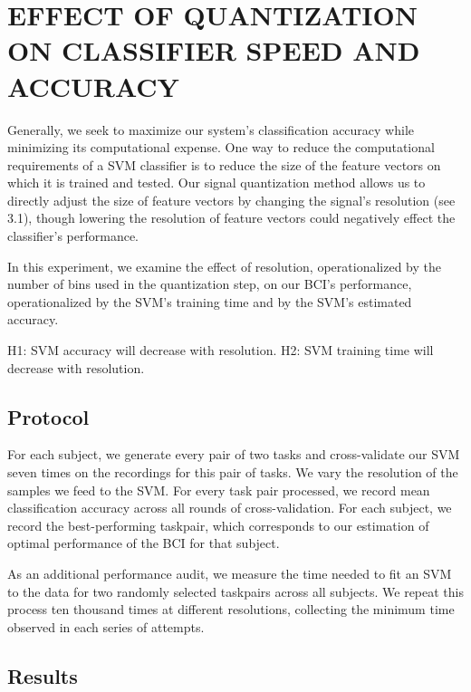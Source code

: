 \section{\uppercase{Effect of quantization on classifier speed and accuracy}}
\label{sec:results}

Generally, we seek to maximize our system's classification accuracy while minimizing its computational expense. One way to reduce the computational requirements of a SVM classifier is to reduce the size of the feature vectors on which it is trained and tested. Our signal quantization method allows us to directly adjust the size of feature vectors by changing the signal's resolution (see 3.1), though lowering the resolution of feature vectors could negatively effect the classifier's performance.

In this experiment, we examine the effect of resolution, operationalized by the number of bins used in the quantization step, on our BCI's performance, operationalized by the SVM's training time and by the SVM's estimated accuracy. 

H1: SVM accuracy will decrease with resolution.
H2: SVM training time will decrease with resolution.

\subsection{Protocol}

For each subject, we generate every pair of two tasks and cross-validate our SVM seven times on the recordings for this pair of tasks. We vary the resolution of the samples we feed to the SVM. For every task pair processed, we record mean classification accuracy across all rounds of cross-validation. For each subject, we record the best-performing taskpair, which corresponds to our estimation of optimal performance of the BCI for that subject.

As an additional performance audit, we measure the time needed to fit an SVM to the data for two randomly selected taskpairs across all subjects. We repeat this process ten thousand times at different resolutions, collecting the minimum time observed in each series of attempts.

\subsection{Results}

